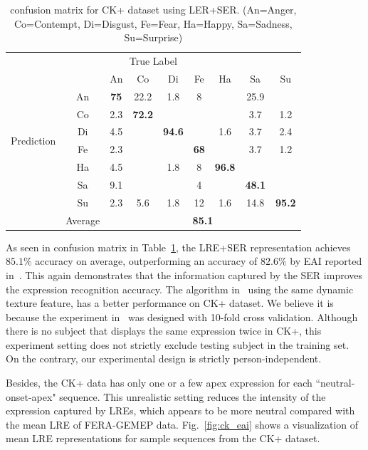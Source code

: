 \documentclass[journal]{IEEEtran}
\begin{document}
\begin{table}[htbp]
\caption{confusion matrix for CK+ dataset using LER+SER.
(An=Anger, Co=Contempt, Di=Disgust, Fe=Fear, Ha=Happy, Sa=Sadness, Su=Surprise)}
\begin{center}
\label{table:CK_result}
\begin{tabular}{c|c|ccccccc|}

\multicolumn{9}{c}{True Label} \\ \cline{2-9}
\multirow{8}{*}{\begin{sideways}Prediction\end{sideways}} && An & Co & Di & Fe & Ha & Sa & Su \\ \cline{2-9}
&An          &\textbf{75} &22.2  &1.8  &8  &  &25.9 &  \\ 
&Co       &2.3  &\textbf{72.2}  &   &   &  &3.7  &1.2 \\ 
&Di        &4.5  &   &\textbf{94.6} &  &1.6 &3.7 &2.4  \\ 
&Fe           &2.3   &   &   &\textbf{68} &  &3.7  &1.2  \\ 
&Ha          &4.5   &   &1.8  &8 &\textbf{96.8} &  &  \\ 
&Sa        &9.1  &  &  &4   &  &\textbf{48.1} & \\ 
&Su       &2.3  &5.6 &1.8  &12 &1.6  &14.8 &\textbf{95.2} \\ \cline{2-9}
&Average &\multicolumn{7}{c|}{\textbf{85.1}} \\ \cline{2-9}

\end{tabular}
\end{center}
\end{table}


As seen in confusion matrix in Table~\ref{table:CK_result}, the LRE+SER representation achieves $85.1\%$ accuracy on average, outperforming an accuracy of $82.6\%$ by EAI reported in~\cite{Yang_SMCB12}. This again demonstrates that the information captured by the SER improves the expression recognition accuracy. The algorithm in~\cite{Zhao_PAMI07} using the same dynamic texture feature, has a better performance on CK+ dataset. We believe it is because the experiment in~\cite{Zhao_PAMI07} was designed with 10-fold cross validation. Although there is no subject that displays the same expression twice in CK+, this experiment setting does not strictly exclude testing subject in the training set. On the contrary, our experimental design is strictly person-independent.

Besides, the CK+ data has only one or a few apex expression for each ``neutral-onset-apex" sequence. This unrealistic setting reduces the intensity of the expression captured by LREs, which appears to be more neutral compared with the mean LRE of FERA-GEMEP data. Fig.~\ref{fig:ck_eai} shows a visualization of mean LRE representations for sample sequences from the CK+ dataset. 
\end{document}
